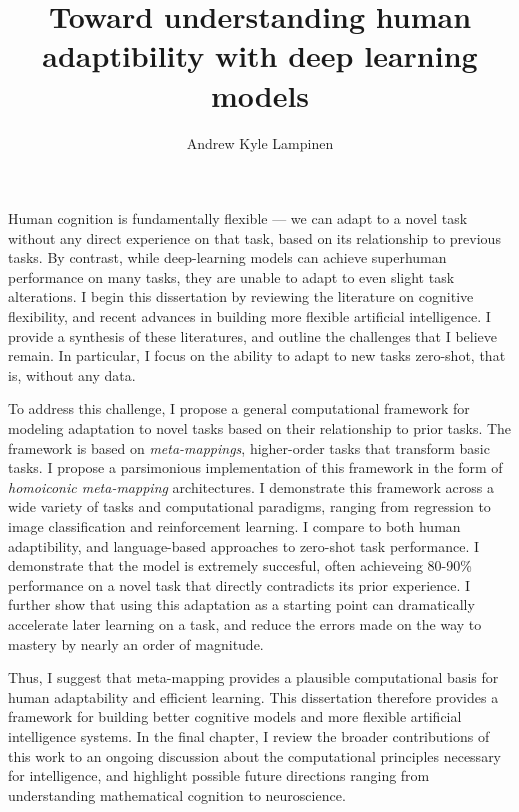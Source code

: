 \documentclass{report}
\begin{document}
\title{Toward understanding human adaptibility with deep learning models}
\author{Andrew Kyle Lampinen}

\beforepreface
\setcounter{page}{4}  %

Human cognition is fundamentally flexible --- we can adapt to a novel task without any direct experience on that task, based on its relationship to previous tasks. By contrast, while deep-learning models can achieve superhuman performance on many tasks, they are unable to adapt to even slight task alterations. I begin this dissertation by reviewing the literature on cognitive flexibility, and recent advances in building more flexible artificial intelligence. I provide a synthesis of these literatures, and outline the challenges that I believe remain. In particular, I focus on the ability to adapt to new tasks zero-shot, that is, without any data.\par
To address this challenge, I propose a general computational framework for modeling adaptation to novel tasks based on their relationship to prior tasks. The framework is based on \emph{meta-mappings}, higher-order tasks that transform basic tasks. I propose a parsimonious implementation of this framework in the form of \emph{homoiconic meta-mapping} architectures. I demonstrate this framework across a wide variety of tasks and computational paradigms, ranging from regression to image classification and reinforcement learning. I compare to both human adaptibility, and language-based approaches to zero-shot task performance. I demonstrate that the model is extremely succesful, often achieveing 80-90\% performance on a novel task that directly contradicts its prior experience. I further show that using this adaptation as a starting point can dramatically accelerate later learning on a task, and reduce the errors made on the way to mastery by nearly an order of magnitude. \par
Thus, I suggest that meta-mapping provides a plausible computational basis for human adaptability and efficient learning. This dissertation therefore provides a framework for building better cognitive models and more flexible artificial intelligence systems. In the final chapter, I review the broader contributions of this work to an ongoing discussion about the computational principles necessary for intelligence, and highlight possible future directions ranging from understanding mathematical cognition to neuroscience. 
\end{document}
